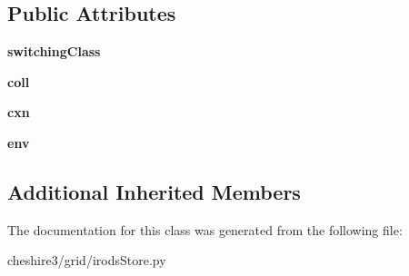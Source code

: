 \subsection*{Public Attributes}
\begin{DoxyCompactItemize}
\item 
\hypertarget{classcheshire3_1_1grid_1_1irods_store_1_1_irods_switching_record_store_a44974dd6da6e4b6277694711174c5fb4}{{\bfseries switching\-Class}}\label{classcheshire3_1_1grid_1_1irods_store_1_1_irods_switching_record_store_a44974dd6da6e4b6277694711174c5fb4}

\item 
\hypertarget{classcheshire3_1_1grid_1_1irods_store_1_1_irods_switching_record_store_aed7811dad7c860e484a07f2ea0cf54da}{{\bfseries coll}}\label{classcheshire3_1_1grid_1_1irods_store_1_1_irods_switching_record_store_aed7811dad7c860e484a07f2ea0cf54da}

\item 
\hypertarget{classcheshire3_1_1grid_1_1irods_store_1_1_irods_switching_record_store_abd826cb04d68add8719d509972a7f87f}{{\bfseries cxn}}\label{classcheshire3_1_1grid_1_1irods_store_1_1_irods_switching_record_store_abd826cb04d68add8719d509972a7f87f}

\item 
\hypertarget{classcheshire3_1_1grid_1_1irods_store_1_1_irods_switching_record_store_a04e102276b5c104fda84823dc46627c7}{{\bfseries env}}\label{classcheshire3_1_1grid_1_1irods_store_1_1_irods_switching_record_store_a04e102276b5c104fda84823dc46627c7}

\end{DoxyCompactItemize}
\subsection*{Additional Inherited Members}


The documentation for this class was generated from the following file\-:\begin{DoxyCompactItemize}
\item 
cheshire3/grid/irods\-Store.\-py\end{DoxyCompactItemize}
